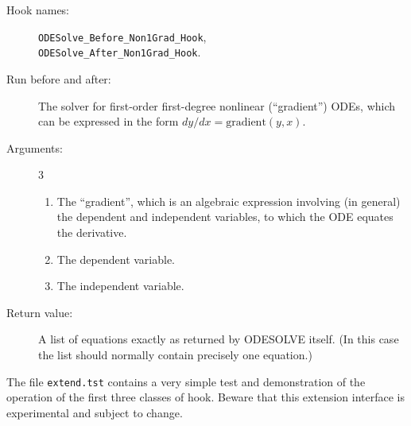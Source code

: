 \noindent\hrulefill

\begin{description}
\item[Hook names:] \texttt{ODESolve\_Before\_Non1Grad\_Hook}, \\
\texttt{ODESolve\_After\_Non1Grad\_Hook}.
\item[Run before and after:] The solver for first-order first-degree
nonlinear (``gradient'') ODEs, which can be expressed in the form
$dy/dx = \mathrm{gradient}(y,x)$.
\item[Arguments:] 3
\begin{enumerate}
\item The ``gradient'', which is an algebraic expression involving (in
general) the dependent and independent variables, to which the ODE
equates the derivative.
\item The dependent variable.
\item The independent variable.
\end{enumerate}
\item[Return value:] A list of equations exactly as returned by
ODESOLVE itself.  (In this case the list should normally contain
precisely one equation.)
\end{description}

\noindent\hrulefill
\bigskip

The file \texttt{extend.tst} contains a very simple test and
demonstration of the operation of the first three classes of hook.
Beware that this extension interface is experimental and subject to
change.
